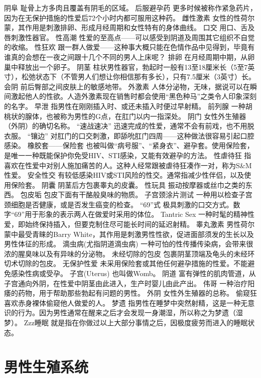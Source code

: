\documentclass[12pt,UTF8]{ctexbook}
\begin{document}
阴阜
耻骨上方多肉且覆盖有阴毛的区域。
后服避孕药
更多时候被称作紧急药片，因为在无保护措施的性爱后72个小时内都可服用这种药。
雌性激素
女性的性荷尔蒙，其作用是刺激排卵、形成月经周期和女性特有的身体曲线。
口交
用口、舌及唇刺激性器官。
性高潮
性爱的至高点——可以感受到阴道及周围其它组织不自觉的收缩。
性狂欢
跟一群人做爱——这种事大概只能在色情作品中见得到，毕竟有谁真的会想在一夜之间跟十几个不同的男人上床呢？
排卵
在月经周期中期，从卵巢中释放出一个卵子。
阴茎
柱状男性器官，勃起时一般有13至18厘米长（5至7英寸），松弛状态下（不管男人们想让你相信那有多长），只有7.5厘米（3英寸）长。
会阴
前后臀部之间皮肤上的敏感地带。
外激素
人体分泌物，无味，据说可以在瞬间激起他人的性欲。人造外激素现在销售时都会使用“黑色种马”之类令人印象深刻的名字。
早泄
指男性在刚刚插入时、或还未插入时便过早射精。
前列腺
一种胡桃状的腺体，也被称为男性的G点，在肛门以内一指深处。
阴门
女性外生殖器（外阴）的确切名称。
“速战速决”
迅速完成的性爱，通常不会有前戏，也不用脱衣服。
“镶边”
对肛门的口交刺激，即舔吮肛门四周——这种做法很容易引起口腔感染。
橡胶套——保险套
也被叫做“病号服”、“紧身衣”、避孕套。使用保险套，是唯一一种既能保护你免受HIV、STI感染，又能有效避孕的方法。
性虐待狂
指喜欢在性爱中对别人施加痛苦的人。这种人经常跟被虐待狂凑作一对，称为S\&M性爱。
安全性交
有较低感染HIV或STI风险的性交。通常指减少性伴侣，以及使用保险套。
阴囊
阴茎后方包裹睾丸的皮囊。
性玩具
振动按摩器或丝巾之类的东西。
包皮垢
包皮下面有干酪般臭味的物质。
子宫颈涂片测试
一种用以检查子宫颈细胞是否健康，或是否发生癌变的检查。
“69”式
极具刺激的口交方式。数字“69”用于形象的表示两人在做爱时采用的体位。
Tantric Sex
一种时髦的精神性爱，即始终保持插入，但要克制住尽可能长时间的延迟射精。
睾丸激素
男性荷尔蒙中最受青睐的Barry White，其作用是刺激男性性欲，促进面部须发的生长以及男性体征的形成。
滴虫病(尤指阴道滴虫病)
一种可怕的性传播传染病，会带来很浓的腥臭味以及有异味的分泌物。
未经切除的包皮
包裹阴茎顶端及龟头的未经环切术切除的包皮。
无保护性爱
未采用保险套或其他任何避孕措施的性爱。不能避免感染性病或受孕。
子宫(Uterus)
也叫做Womb。
阴道
富有弹性的肌肉管道，从子宫通向外阴，在性爱中阴茎由此进入，生产时婴儿由此产出。
伟哥
一种治疗阳痿的药物，用于帮助那些勃起有问题的男性。
外阴
女性外生殖器的总称。
偷窥狂
喜欢赤身裸体偷窥他人做爱的人。
梦遗
指男性在睡梦中突然射精，这是一种无意识的行为。因为男性通常在醒来之后才会发现一身潮湿，所以称之为梦遗（湿梦）。
Zzz睡眠
就是指在你做过以上大部分事情之后，因极度疲劳而进入的睡眠状态。





\chapter{男性生殖系统}
\end{document}

